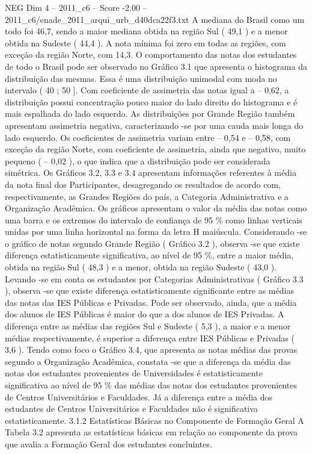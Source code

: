 \begin{textsample}{NEG Dim 4 – 2011\_c6 – Score -2.00 – 2011\_c6/enade\_2011\_arqui\_urb\_d40dca22f3.txt}
A mediana do Brasil como um todo foi 46,7, sendo a maior mediana obtida na região Sul ( 49,1 ) e a menor obtida na Sudeste ( 44,4 ).
A nota mínima foi zero em todas as regiões, com exceção da região Norte, com 14,3.
O comportamento das notas dos estudantes de todo o Brasil pode ser observado no Gráfico 3.1 que apresenta o histograma da distribuição das mesmas.
Essa é uma distribuição unimodal com moda no intervalo ( 40 ; 50 ].
Com coeficiente de assimetria das notas igual a – 0,62, a distribuição possui concentração pouco maior do lado direito do histograma e é mais espalhada do lado esquerdo.
As distribuições por Grande Região também apresentam assimetria negativa, caracterizando -se por uma cauda mais longa do lado esquerdo.
Os coeficientes de assimetria variam entre – 0,54 e – 0,58, com exceção da região Norte, com coeficiente de assimetria, ainda que negativo, muito pequeno ( – 0,02 ), o que indica que a distribuição pode ser considerada simétrica.
Os Gráficos 3.2, 3.3 e 3.4 apresentam informações referentes à média da nota final dos Participantes, desagregando os resultados de acordo com, respectivamente, as Grandes Regiões do país, a Categoria Administrativa e a Organização Acadêmica.
Os gráficos apresentam o valor da média das notas como uma barra e os extremos do intervalo de confiança de 95 \% como linhas verticais unidas por uma linha horizontal na forma da letra H maiúscula.
Considerando -se o gráfico de notas segundo Grande Região ( Gráfico 3.2 ), observa -se que existe diferença estatisticamente significativa, ao nível de 95 \%, entre a maior média, obtida na região Sul ( 48,3 ) e a menor, obtida na região Sudeste ( 43,0 ).
Levando -se em conta os estudantes por Categorias Administrativas ( Gráfico 3.3 ), observa -se que existe diferença estatisticamente significante entre as médias das notas das IES Públicas e Privadas.
Pode ser observado, ainda, que a média dos alunos de IES Públicas é maior do que a dos alunos de IES Privadas.
A diferença entre as médias das regiões Sul e Sudeste ( 5,3 ), a maior e a menor médias respectivamente, é superior a diferença entre IES Públicas e Privadas ( 3,6 ).
Tendo como foco o Gráfico 3.4, que apresenta as notas médias das provas segundo a Organização Acadêmica, constata -se que a diferença da média das notas dos estudantes provenientes de Universidades é estatisticamente significativa ao nível de 95 \% das médias das notas dos estudantes provenientes de Centros Universitários e Faculdades.
Já a diferença entre a média dos estudantes de Centros Universitários e Faculdades não é significativa estatisticamente. 3.1.2 Estatísticas Básicas no Componente de Formação Geral A Tabela 3.2 apresenta as estatísticas básicas em relação ao componente da prova que avalia a Formação Geral dos estudantes concluintes.

\end{textsample}

